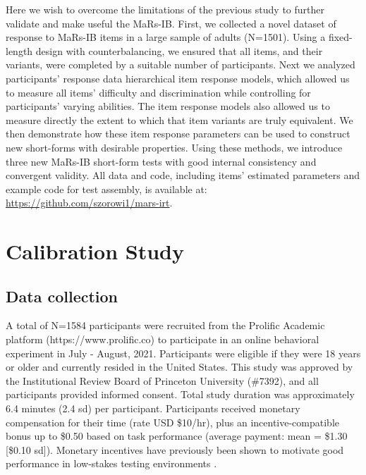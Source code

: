 \documentclass[a4paper,man,natbib]{apa6}
\begin{document}
Here we wish to overcome the limitations of the previous study to further validate and make useful the MaRs-IB. First, we collected a novel dataset of response to MaRs-IB items in a large sample of adults (N=1501). Using a fixed-length design with counterbalancing, we ensured that all items, and their variants, were completed by a suitable number of participants. Next we analyzed participants' response data hierarchical item response models, which allowed us to measure all items' difficulty and discrimination while controlling for participants' varying abilities. The item response models also allowed us to measure directly the extent to which that item variants are truly equivalent. We then demonstrate how these item response parameters can be used to construct new short-forms with desirable properties. Using these methods, we introduce three new MaRs-IB short-form tests with good internal consistency and convergent validity. 
All data and code, including items' estimated parameters and example code for test assembly, is available at: \url{https://github.com/szorowi1/mars-irt}.

\section{Calibration Study}

\subsection{Data collection}

A total of N=1584 participants were recruited from the Prolific Academic platform (https://www.prolific.co) to participate in an online behavioral experiment in July - August, 2021. Participants were eligible if they were 18 years or older and currently resided in the United States. This study was approved by the Institutional Review Board of Princeton University (\#7392), and all participants provided informed consent. Total study duration was approximately 6.4 minutes (2.4 sd) per participant. Participants received monetary compensation for their time (rate USD \$10/hr), plus an incentive-compatible bonus up to \$0.50 based on task performance (average payment: mean = \$1.30 [\$0.10 sd]). Monetary incentives have previously been shown to motivate good performance in low-stakes testing environments \citep{duckworth2011role, gignac2018moderate}.
\end{document}
